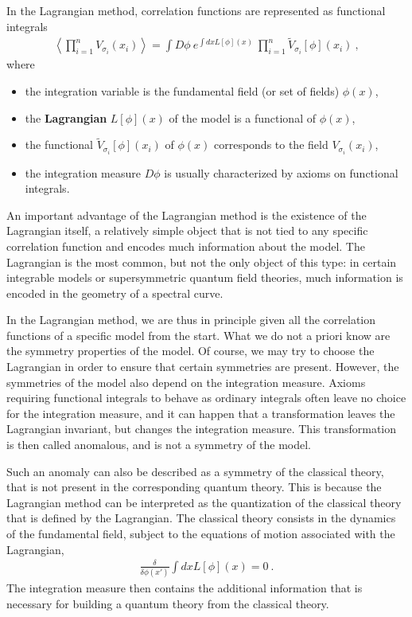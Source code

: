 \documentclass[12pt, a4paper, notitlepage, twoside]{report}
\numberwithin{equation}{section}
\theoremstyle{break}
\begin{document}
In the Lagrangian method, correlation functions are represented as functional integrals
\begin{align}
 \left\langle\prod_{i=1}^n V_{\sigma_i}(x_i)\right\rangle = \int D\phi\ e^{\int dx L[\phi](x)} \ \prod_{i=1}^n \tilde{V}_{\sigma_i}[\phi](x_i)\ ,
\end{align}
where  
\begin{itemize}
 \item the integration variable is the fundamental field (or set of fields) $\phi(x)$,
\item the \textbf{\boldmath Lagrangian} $L[\phi](x)$ of the model is a functional of $\phi(x)$,
\item the functional $\tilde{V}_{\sigma_i}[\phi](x_i)$ of $\phi(x)$ corresponds to the field $ V_{\sigma_i}(x_i)$,
\item the integration measure $D\phi$ is usually characterized by axioms on functional integrals. 
\end{itemize}
An important advantage of the Lagrangian method is the existence of the Lagrangian itself, a relatively simple object that is not tied to any specific correlation function and encodes much information about the model.
The Lagrangian is the most common, but not the only object of this type: in certain integrable models or supersymmetric quantum field theories, much information is encoded in the geometry of a spectral curve.

In the Lagrangian method, we are thus in principle given all the correlation functions of a specific model from the start.
What we do not a priori know are the symmetry properties of the model.
Of course, we may try to choose the Lagrangian in order to ensure that certain symmetries are present.
However, the symmetries of the model also depend on the integration measure.
Axioms requiring functional integrals to behave as ordinary integrals often leave no choice for the integration measure, and 
it can happen that a transformation leaves the Lagrangian invariant, but changes the integration measure.
This transformation is then called anomalous, and is not a symmetry of the model.

Such an anomaly can also be described as a symmetry of the classical theory, that is not present in the corresponding quantum theory.
This is because the Lagrangian method can be interpreted as the quantization of the classical theory that is defined by the Lagrangian.
The classical theory consists in the dynamics of the fundamental field, subject to the equations of motion associated with the Lagrangian, 
\begin{align}
 \frac{\delta }{\delta \phi(x')} \int dx L[\phi](x) = 0 \ .
\end{align}
The integration measure then contains the additional information that is necessary for building a quantum theory from the classical theory. 
\end{document}
